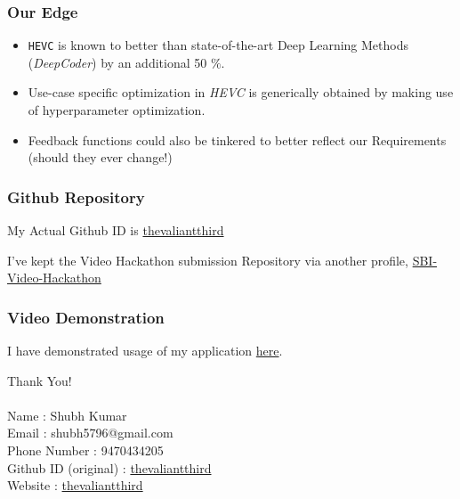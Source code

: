 \documentclass{beamer}
\begin{document}
\begin{frame}
    \frametitle{Our Edge}
    \begin{itemize}
        \item \texttt{HEVC} is known to better than state-of-the-art Deep Learning Methods (\textit{DeepCoder}) by an additional 50 $\%$.
        \pause
        \item Use-case specific optimization in \textit{HEVC} is generically obtained by making use of hyperparameter optimization.
        \pause
        \item Feedback functions could also be tinkered to better reflect our Requirements (should they ever change!)
    \end{itemize}
\end{frame}

\begin{frame}
    \frametitle{Github Repository}

    My Actual Github ID is \href{https://github.com/thevaliantthird}{thevaliantthird}

    I've kept the Video Hackathon submission Repository via another profile, \href{https://github.com/theintrepidthird/SBI-Video-Hackathon}{SBI-Video-Hackathon}
\end{frame}

\begin{frame}
    \frametitle{Video Demonstration}

    I have demonstrated usage of my application \href{https://github.com/theintrepidthird/SBI-Video-Hackathon/blob/main/demonstration.mp4}{here}.
\end{frame}

\begin{frame}
    \begin{center}
        Thank You! \\~\\
        Name : Shubh Kumar  \\
        Email : shubh5796@gmail.com \\
        Phone Number : 9470434205 \\
        Github ID (original) : \href{https://github.com/thevaliantthird}{thevaliantthird} \\ 
        Website : \href{thevaliantthird.github.io}{thevaliantthird}
        
    \end{center}

\end{frame}
\end{document}
